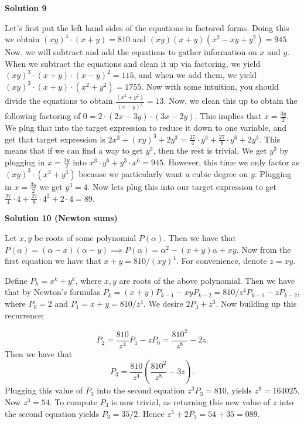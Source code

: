 \begin{enumerate}
\textbf{Solution 9}

Let's first put the left hand sides of the equations in factored forms. Doing this we obtain $(xy)^4 \cdot (x + y) = 810$ and $(xy)(x + y)(x^2 - xy + y^2) = 945$. Now, we will subtract and add the equations to gather information on $x$ and $y$. When we subtract the equations and clean it up via factoring, we yield $(xy)^3 \cdot (x + y) \cdot (x - y)^2 = 115$, and when we add them, we yield $(xy)^3 \cdot (x + y) \cdot (x^2 + y^2) = 1755$. Now with some intuition, you should divide the equations to obtain $\frac{(x^2 + y^2)}{(x - y)^2} = 13$. Now, we clean this up to obtain the following factoring of $0 = 2 \cdot (2x - 3y) \cdot (3x - 2y)$. This implies that $x = \frac{3y}{2}$. We plug that into the target expression to reduce it down to one variable, and get that target expression is $2x^3 + (xy)^3 + 2y^3 = \frac{27}{4} \cdot y^3 + \frac{27}{8} \cdot y^6 + 2y^3$. This means that if we can find a way to get $y^3$, then the rest is trivial. We get $y^3$ by plugging in $x = \frac{3y}{2}$ into $x^3 \cdot y^6 + y^3 \cdot x^6 = 945$. However, this time we only factor as $(xy)^3 \cdot (x^3 + y^3)$ because we particularly want a cubic degree on $y$. Plugging in $x = \frac{3y}{2}$ we get $y^3 = 4$. Now lets plug this into our target expression to get $\frac{27}{4} \cdot 4 + \frac{27}{8} \cdot 4^2 + 2 \cdot 4 = \boxed{89}$.

 



\textbf{Solution 10 (Newton sums)}

Let $x, y$ be roots of some polynomial $P(\alpha)$. Then we have that $P(\alpha) = (\alpha - x)(\alpha - y) \implies P(\alpha) = \alpha^2 - (x + y) \alpha + xy$. Now from the first equation we have that $x + y = 810/(xy)^4$. For convenience, denote $z = xy$.

 Define $P_k = x^k + y^k$, where $x, y$ are roots of the above polynomial. Then we have that by Newton's formulas $P_k = (x + y)P_{k - 1} - xyP_{k - 2} = 810/z^4P_{k - 1} - zP_{k - 2}$, where $P_0 = 2$ and $P_1 = x + y = 810/z^4$. We desire $2P_3 + z^3$. Now building up this recurrence; 

 
 \[P_2 = \frac{810}{z^4}P_1 - zP_0 = \frac{810^2}{z^8} - 2z.\] Then we have that 
 \[P_3 = \frac{810}{z^4} \left(\frac{810^2}{z^8} - 3z \right).\] Plugging this value of $P_3$ into the second equation $z^3P_3 = 810$, yields $z^9 = 164025$. Now $z^3 = 54$. To compute $P_3$ is now trivial, as returning this new value of $z$ into the second equation yields $P_3 = 35/2$. Hence $z^3 + 2P_3 = 54 + 35 = \boxed{089}$.


\end{enumerate}
